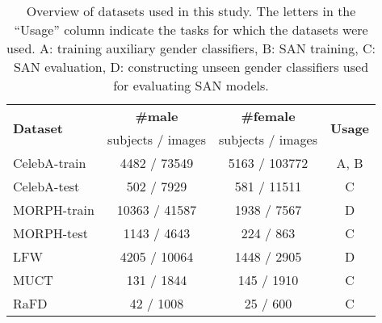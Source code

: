 \documentclass[10pt,twocolumn,letterpaper]{article}
\begin{document}
\begin{table}[h]
\begin{center}
\begin{threeparttable}
\caption{Overview of datasets used in this study. The letters in the ``Usage'' column indicate the tasks for which the datasets were used. A: training auxiliary gender classifiers, B: SAN training, C: SAN evaluation, D: constructing unseen gender classifiers used for evaluating SAN models.}
\label{tab:datasets}
\centering
\small
\begin{tabular}{ l c c c}
 \toprule
 \multirow{2}{*}{ {\bf Dataset} } & {\bf \#male}& {\bf \#female}&   \multirow{2}{*}{ {\bf Usage} } \\
& {subjects / images} & {subjects / images} & \\
\midrule
CelebA-train & 4482 / \num[group-separator={,}]{73549} & 5163 / \num[group-separator={,}]{103772} & A, B\\ 
CelebA-test & 502 / \num[group-separator={,}]{7929} & 581 / \num[group-separator={,}]{11511}  & C\\ 
MORPH-train & \num[group-separator={,}]{10363} / \num[group-separator={,}]{41587} &  1938 / \num[group-separator={,}]{7567}  & D\\ 
MORPH-test & 1143 / \num[group-separator={,}]{4643} & 224 / 863 & C\\ 
LFW & 4205 / \num[group-separator={,}]{10064} & 1448 / \num[group-separator={,}]{2905}  & D\\ 
MUCT & 131 / \num[group-separator={,}]{1844} & 145 / \num[group-separator={,}]{1910}   & C\\ 
RaFD & 42 / \num[group-separator={,}]{1008} & 25 / 600 & C\\ 
\bottomrule 
\end{tabular} %
\end{threeparttable}
\end{center}
\end{table}
\end{document}
